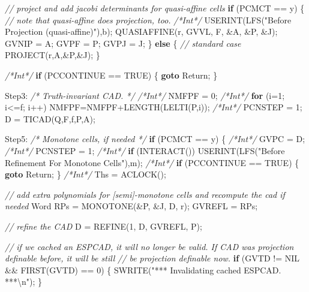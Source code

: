 \documentclass[
]{book}
\newenvironment{Shaded}{\begin{snugshade}}{\end{snugshade}}
\newcommand{\CharTok}[1]{\textcolor[rgb]{0.31,0.60,0.02}{#1}}
\newcommand{\CommentTok}[1]{\textcolor[rgb]{0.56,0.35,0.01}{\textit{#1}}}
\newcommand{\ControlFlowTok}[1]{\textcolor[rgb]{0.13,0.29,0.53}{\textbf{#1}}}
\newcommand{\DecValTok}[1]{\textcolor[rgb]{0.00,0.00,0.81}{#1}}
\newcommand{\NormalTok}[1]{#1}
\newcommand{\SpecialCharTok}[1]{\textcolor[rgb]{0.00,0.00,0.00}{#1}}
\newcommand{\StringTok}[1]{\textcolor[rgb]{0.31,0.60,0.02}{#1}}
\theoremstyle{definition}
\theoremstyle{definition}
\theoremstyle{definition}
\theoremstyle{definition}
\theoremstyle{remark}
\begin{document}
\begin{Shaded}
\begin{Highlighting}[numbers=left,,]
    \CommentTok{// project and add jacobi determinants for quasi{-}affine cells}
    \ControlFlowTok{if}\NormalTok{ (PCMCT == }\CharTok{\textquotesingle{}y\textquotesingle{}}\NormalTok{) \{}
        \CommentTok{// note that quasi{-}affine does projection, too.}
        \CommentTok{/*Int*/}\NormalTok{     USERINT(LFS(}\StringTok{"Before Projection (quasi{-}affine)"}\NormalTok{),}\CharTok{\textquotesingle{}b\textquotesingle{}}\NormalTok{);}
\NormalTok{        QUASIAFFINE(r, GVVL, F, \&A, \&P, \&J);}
\NormalTok{        GVNIP = A;}
\NormalTok{        GVPF = P;}
\NormalTok{        GVPJ = J;}
\NormalTok{    \} }\ControlFlowTok{else}\NormalTok{ \{ }\CommentTok{// standard case}
\NormalTok{        PROJECT(r,A,\&P,\&J);}
\NormalTok{    \}}

    \CommentTok{/*Int*/} \ControlFlowTok{if}\NormalTok{ (PCCONTINUE == TRUE) \{ }\ControlFlowTok{goto}\NormalTok{ Return; \}}

\NormalTok{Step3: }\CommentTok{/* Truth{-}invariant CAD. */}
    \CommentTok{/*Int*/}\NormalTok{ NMFPF = }\DecValTok{0}\NormalTok{;}
    \CommentTok{/*Int*/} \ControlFlowTok{for}\NormalTok{ (i=}\DecValTok{1}\NormalTok{; i\textless{}=f; i++) NMFPF=NMFPF+LENGTH(LELTI(P,i));}
    \CommentTok{/*Int*/}\NormalTok{ PCNSTEP = }\DecValTok{1}\NormalTok{;}
\NormalTok{    D = TICAD(Q,F,f,P,A);}

\NormalTok{Step5: }\CommentTok{/* Monotone cells, if needed */}
    \ControlFlowTok{if}\NormalTok{ (PCMCT == }\CharTok{\textquotesingle{}y\textquotesingle{}}\NormalTok{) \{}
        \CommentTok{/*Int*/}\NormalTok{ GVPC = D;}
        \CommentTok{/*Int*/}\NormalTok{ PCNSTEP = }\DecValTok{1}\NormalTok{;}
        \CommentTok{/*Int*/} \ControlFlowTok{if}\NormalTok{ (INTERACT()) USERINT(LFS(}\StringTok{"Before Refinement For Monotone Cells"}\NormalTok{),}\CharTok{\textquotesingle{}m\textquotesingle{}}\NormalTok{);}
        \CommentTok{/*Int*/} \ControlFlowTok{if}\NormalTok{ (PCCONTINUE == TRUE) \{ }\ControlFlowTok{goto}\NormalTok{ Return; \}}
        \CommentTok{/*Int*/}\NormalTok{ Ths = ACLOCK();}

        \CommentTok{// add extra polynomials for [semi]{-}monotone cells and recompute the cad if needed}
\NormalTok{        Word RPs = MONOTONE(\&P, \&J, D, r);}
\NormalTok{        GVREFL = RPs;}

        \CommentTok{// refine the CAD}
\NormalTok{        D = REFINE(}\DecValTok{1}\NormalTok{, D, GVREFL, P);}

        \CommentTok{// if we cached an ESPCAD, it will no longer be valid. If CAD was projection definable before, it will be still}
        \CommentTok{// be projection definable now.}
        \ControlFlowTok{if}\NormalTok{ (GVTD != NIL \&\& FIRST(GVTD) == }\DecValTok{0}\NormalTok{) \{}
\NormalTok{            SWRITE(}\StringTok{"*** Invalidating cached ESPCAD. ***}\SpecialCharTok{\textbackslash{}n}\StringTok{"}\NormalTok{);}
\NormalTok{        \}}


\end{Highlighting}
\end{Shaded}
\end{document}
